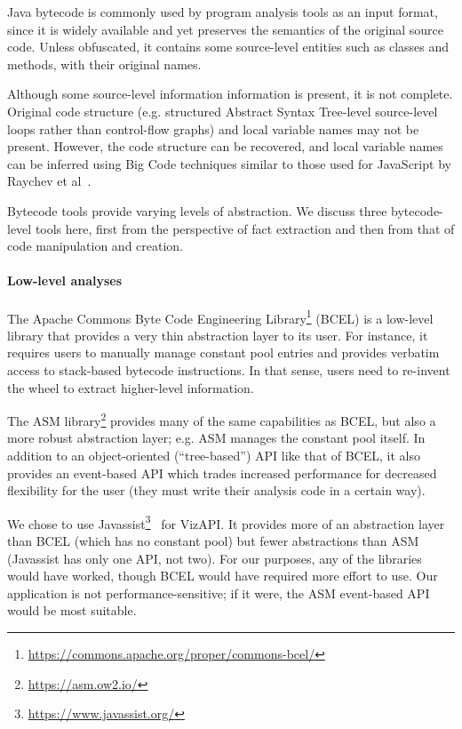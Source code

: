Java bytecode is commonly used by program analysis tools as an input
format, since it is widely available and yet preserves the semantics
of the original source code. Unless obfuscated, it contains some
source-level entities such as classes and methods, with their original
names.

Although some source-level information information is present, it is
not complete. Original code structure (e.g. structured Abstract Syntax
Tree-level source-level loops rather than control-flow graphs) and
local variable names may not be present. However, the code structure
can be recovered, and local variable names can be inferred using Big
Code techniques similar to those used for JavaScript by Raychev et
al~\cite{raychev2016learning}.

Bytecode tools provide varying levels of abstraction. We discuss three
bytecode-level tools here, first from the perspective of fact extraction
and then from that of code manipulation and creation.

\paragraph{Low-level analyses}
The Apache Commons Byte Code Engineering Library\footnote{\url{https://commons.apache.org/proper/commons-bcel/}} (BCEL) is a low-level library that
provides a very thin abstraction layer to its user. For instance,
it requires users to manually manage constant pool entries and provides
verbatim access to stack-based bytecode instructions. In that sense,
users need to re-invent the wheel to extract higher-level information.

The ASM library\footnote{\url{https://asm.ow2.io/}} provides many of
the same capabilities as BCEL, but also a more robust
abstraction layer; e.g. ASM manages the constant pool
itself. In addition to an object-oriented (``tree-based'') API like
that of BCEL, it also provides an event-based API which trades increased
performance for decreased flexibility for the user (they must write
their analysis code in a certain way).

We chose to use
Javassist\footnote{\url{https://www.javassist.org/}}~\cite{chiba00:_load_struc_reflec_java}
for VizAPI. It provides more of an abstraction layer than BCEL (which has no
constant pool) but fewer abstractions than ASM (Javassist has only one API, not
two). For our purposes, any of the libraries would have
worked, though BCEL would have required more effort to use. Our application
is not performance-sensitive; if it were, the ASM event-based API would be most suitable.


